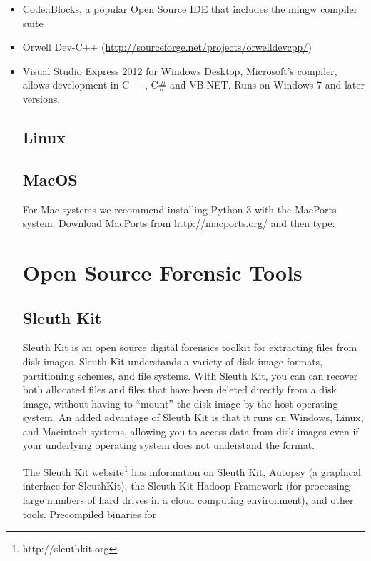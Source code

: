\begin{itemize}
\item Code::Blocks,
  a popular Open Source IDE that includes the mingw compiler suite 
\item Orwell Dev-C++
  (\url{http://sourceforge.net/projects/orwelldevcpp/})
\item Visual Studio Express 2012 for Windows
  Desktop,
  Microsoft's compiler, allows development in C++, C\# and
  VB.NET. Runs on Windows 7 and later versions.

\subsection{Linux}

\subsection{MacOS}

For Mac systems we recommend installing Python 3 with the MacPorts
system. Download MacPorts from \url{http://macports.org/} and then type:



\section{Open Source Forensic Tools}

\subsection{Sleuth Kit}

Sleuth Kit is an open source digital forensics toolkit for extracting
files from disk images. Sleuth Kit understands a variety of disk image
formats, partitioning schemes, and file systems. With Sleuth Kit, you can can recover
both allocated files and files that have been deleted directly from a
disk image, without having to ``mount'' the disk image by the host
operating system. An added advantage of Sleuth Kit is that it runs on
Windows, Linux, and Macintosh systems, allowing you to access data
from disk images even if your underlying operating system does not
understand the format.

The Sleuth Kit website\footnote{http://sleuthkit.org} has information
on Sleuth Kit, Autopsy (a graphical interface for SleuthKit), the
Sleuth Kit Hadoop Framework (for processing large numbers of hard
drives in a cloud computing environment), and other tools. 
Precompiled binaries for


\end{itemize}

